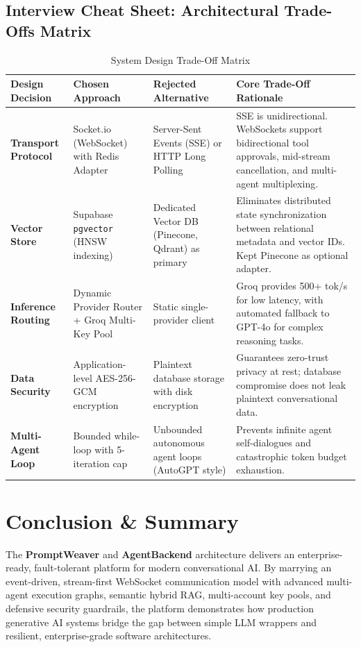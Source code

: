 \documentclass[10pt,a4paper]{article}
\begin{document}
\subsection{Interview Cheat Sheet: Architectural Trade-Offs Matrix}

\begin{table}[h!]
\centering
\small
\begin{tabularx}{\linewidth}{p{3.2cm}p{3.8cm}p{4.2cm}X}
\toprule
\textbf{Design Decision} & \textbf{Chosen Approach} & \textbf{Rejected Alternative} & \textbf{Core Trade-Off Rationale} \\
\midrule
\textbf{Transport Protocol} & Socket.io (WebSocket) with Redis Adapter & Server-Sent Events (SSE) or HTTP Long Polling & SSE is unidirectional. WebSockets support bidirectional tool approvals, mid-stream cancellation, and multi-agent multiplexing. \\
\addlinespace
\textbf{Vector Store} & Supabase \texttt{pgvector} (HNSW indexing) & Dedicated Vector DB (Pinecone, Qdrant) as primary & Eliminates distributed state synchronization between relational metadata and vector IDs. Kept Pinecone as optional adapter. \\
\addlinespace
\textbf{Inference Routing} & Dynamic Provider Router + Groq Multi-Key Pool & Static single-provider client & Groq provides 500+ tok/s for low latency, with automated fallback to GPT-4o for complex reasoning tasks. \\
\addlinespace
\textbf{Data Security} & Application-level AES-256-GCM encryption & Plaintext database storage with disk encryption & Guarantees zero-trust privacy at rest; database compromise does not leak plaintext conversational data. \\
\addlinespace
\textbf{Multi-Agent Loop} & Bounded while-loop with 5-iteration cap & Unbounded autonomous agent loops (AutoGPT style) & Prevents infinite agent self-dialogues and catastrophic token budget exhaustion. \\
\bottomrule
\end{tabularx}
\caption{System Design Trade-Off Matrix}
\end{table}

\section{Conclusion \& Summary}
The \textbf{PromptWeaver} and \textbf{AgentBackend} architecture delivers an enterprise-ready, fault-tolerant platform for modern conversational AI. By marrying an event-driven, stream-first WebSocket communication model with advanced multi-agent execution graphs, semantic hybrid RAG, multi-account key pools, and defensive security guardrails, the platform demonstrates how production generative AI systems bridge the gap between simple LLM wrappers and resilient, enterprise-grade software architectures.
\end{document}
